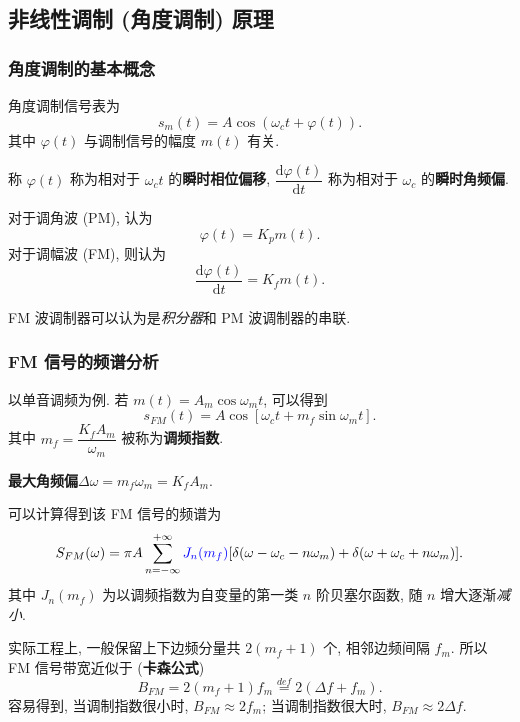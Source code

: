 \subsection{非线性调制 (角度调制) 原理}
\subsubsection{角度调制的基本概念}
角度调制信号表为
\begin{equation}
    s_m(t)=A\cos(\omega_ct+\varphi(t)).
\end{equation}
其中 $\varphi(t)$ 与调制信号的幅度 $m(t)$ 有关.

称 $\varphi(t)$ 称为相对于 $\omega_ct$ 的\textbf{瞬时相位偏移}, $\dfrac{\mathrm{d}\varphi(t)}{\mathrm{d}t}$ 称为相对于 $\omega_c$ 的\textbf{瞬时角频偏}.

对于调角波 (PM), 认为
\begin{equation}
    \varphi(t)=K_pm(t).
\end{equation}
对于调幅波 (FM), 则认为
\begin{equation}
    \frac{\mathrm{d}\varphi(t)}{\mathrm{d}t}=K_fm(t).
\end{equation}

FM 波调制器可以认为是\textit{积分器}和 PM 波调制器的串联.

\subsubsection{FM 信号的频谱分析}
以单音调频为例. 若 $m(t)=A_m\cos\omega_mt$, 可以得到
\begin{equation}
    s_{FM}(t)=A\cos[\omega_ct+m_f\sin\omega_mt].
\end{equation}
其中 $m_f=\dfrac{K_fA_m}{\omega_m}$ 被称为\textbf{调频指数}.

\textbf{最大角频偏}\quad $\Delta\omega=m_f\omega_m=K_fA_m$.

可以计算得到该 FM 信号的频谱为
\begin{equation}
    S_{FM}(\omega)=\pi A\sum_{n=-\infty}^{+\infty}{\color{blue} J_n(m_f)}[\delta(\omega-\omega_c-n\omega_m)+\delta(\omega+\omega_c+n\omega_m)].
\end{equation}
其中 $J_n(m_f)$ 为以调频指数为自变量的第一类 $n$ 阶贝塞尔函数, 随 $n$ 增大逐渐\textit{减小}.

实际工程上, 一般保留上下边频分量共 $2(m_f+1)$ 个, 相邻边频间隔 $f_m$. 所以 FM 信号带宽近似于 (\textbf{卡森公式})
\begin{equation}
    B_{FM}=2(m_f+1)f_m\stackrel{def}{=}2(\Delta f+f_m).
\end{equation}
容易得到, 当调制指数很小时, $B_{FM}\approx2f_m$; 当调制指数很大时, $B_{FM}\approx2\Delta f$.

